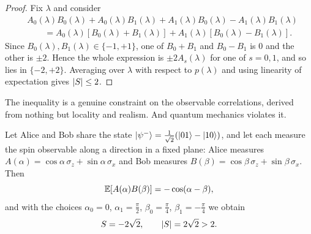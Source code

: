 \documentclass[a4paper]{scrartcl}
\begin{document}
\begin{proof}
	Fix $\lambda$ and consider
	\begin{align*}
		&A_0(\lambda)B_0(\lambda) + A_0(\lambda)B_1(\lambda) + A_1(\lambda)B_0(\lambda) - A_1(\lambda)B_1(\lambda) \\
		&\qquad = A_0(\lambda)\left[B_0(\lambda)+B_1(\lambda)\right] + A_1(\lambda)\left[B_0(\lambda)-B_1(\lambda)\right].
	\end{align*}
	Since $B_0(\lambda), B_1(\lambda) \in \{-1,+1\}$, one of $B_0+B_1$ and $B_0 - B_1$ is $0$ and the other is $\pm2$. Hence the whole expression is $\pm 2 A_s(\lambda)$ for one of $s = 0,1$, and so lies in $\{-2,+2\}$. Averaging over $\lambda$ with respect to $p(\lambda)$ and using linearity of expectation gives $\lvert S\rvert\leq 2$.
\end{proof}

The inequality is a genuine constraint on the observable correlations, derived from nothing but locality and realism. And quantum mechanics violates it.

\begin{theorem}
	Let Alice and Bob share the state $\ket{\psi^-} = \tfrac{1}{\sqrt2}(\ket{01}-\ket{10})$, and let each measure the spin observable along a direction in a fixed plane: Alice measures $A(\alpha) = \cos\alpha\, \sigma_z + \sin\alpha\,\sigma_x$ and Bob measures $B(\beta) = \cos\beta\,\sigma_z + \sin\beta\,\sigma_x$. Then
	$$\mathbb{E}\!\left[A(\alpha)B(\beta)\right] = -\cos(\alpha-\beta),$$
	and with the choices $\alpha_0 = 0$, $\alpha_1 = \tfrac{\pi}{2}$, $\beta_0 = \tfrac{\pi}{4}$, $\beta_1 = -\tfrac{\pi}{4}$ we obtain
	$$S = -2\sqrt2, \qquad \lvert S\rvert = 2\sqrt{2} > 2.$$
\end{theorem}
\end{document}
